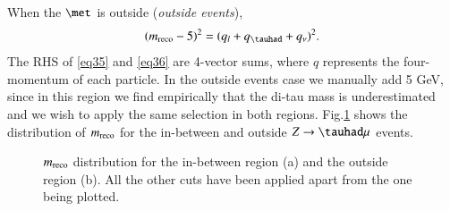 When the $\met$ is outside (\textit{outside events}),
\begin{equation}
(\mreco-5)^{2}=(q_l+q_{\tauhad}+q_\nu)^2.
\label{eq36}
\end{equation}
The RHS of \eqref{eq35} and \eqref{eq36} are 4-vector sums, where $q$ represents the four-momentum of each particle. In the outside events case we manually add 5 GeV, since in this region we find empirically that the di-tau mass is underestimated and we wish to apply the same selection in both regions. Fig.\ref{Fig4} shows the distribution of $m_{\text{reco}}$ for the in-between and outside $Z\to\tauhad\mu$ events. 
\begin{figure}[htbp]
	\centering
	\hfill
	\caption{$m_{\text{reco}}$ distribution for the in-between region (a) and the outside region (b). All the other cuts have been applied apart from the one being plotted.}
	\label{Fig4}
\end{figure}

